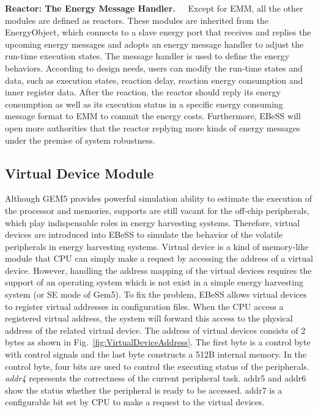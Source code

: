 \textbf{Reactor: The Energy Message Handler.\ \ }
Except for EMM, all the other modules are defined as reactors.
These modules are inherited from the EnergyObject, which connects to a slave energy port that receives and replies the upcoming energy messages and adopts an energy message handler to adjust the run-time execution states.
The message handler is used to define the energy behaviors.
According to design needs, users can modify the run-time states and data, such as execution states, reaction delay, reaction energy consumption and inner register data.
After the reaction, the reactor should reply its energy consumption as well as its execution status in a specific energy consuming message format to EMM to commit the energy costs.
Furthermore, EBeSS will open more authorities that the reactor replying more kinds of energy messages under the premise of system robustness.

\subsection{Virtual Device Module}	\label{sec:tech-vdev}
%
Although GEM5 provides powerful simulation ability to estimate the execution of the processor and memories, supports are still vacant for the off-chip peripherals, which play indispensable roles in energy harvesting systems.
Therefore, virtual devices are introduced into EBeSS to simulate the behavior of the volatile peripherals in energy harvesting systems.
Virtual device is a kind of memory-like module that CPU can simply make a request by accessing the address of a virtual device.
However, handling the address mapping of the virtual devices requires the support of an operating system which is not exist in a simple energy harvesting system (or SE mode of Gem5).
To fix the problem, EBeSS allows virtual devices to register virtual addresses in configuration files. 
When the CPU access a registered virtual address, the system will forward this access to the physical address of the related virtual device.
The address of virtual devices consists of 2 bytes as shown in Fig.~\ref{fig:VirtualDeviceAddress}.
The first byte is a control byte with control signals and the last byte constructs a 512B internal memory. 
In the control byte, four bits are used to control the executing status of the peripherals.
\emph{addr4} represents the correctness of the current peripheral task.
addr5 and addr6 show the status whether the peripheral is ready to be accessed.
addr7 is a configurable bit set by CPU to make a request to the virtual devices.

